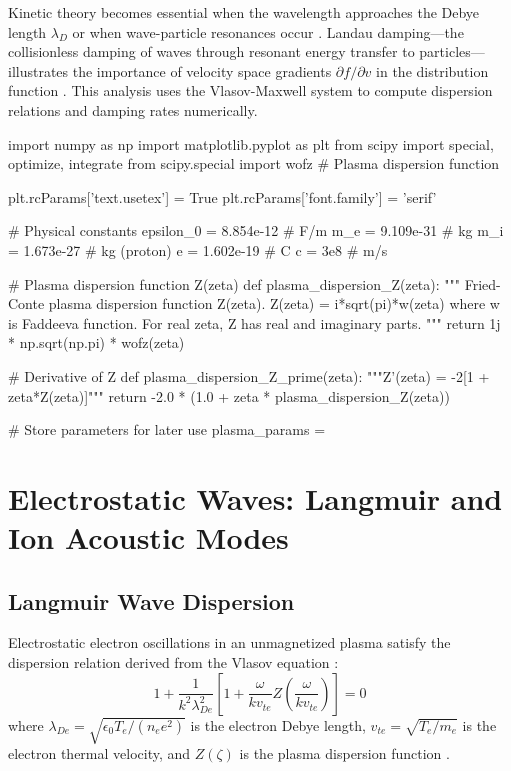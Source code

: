 \documentclass[11pt,a4paper]{article}
\begin{document}
Kinetic theory becomes essential when the wavelength approaches the Debye length $\lambda_D$ or when wave-particle resonances occur \cite{Krall1973}. Landau damping—the collisionless damping of waves through resonant energy transfer to particles—illustrates the importance of velocity space gradients $\partial f/\partial v$ in the distribution function \cite{Landau1946}. This analysis uses the Vlasov-Maxwell system to compute dispersion relations and damping rates numerically.

\begin{pycode}
import numpy as np
import matplotlib.pyplot as plt
from scipy import special, optimize, integrate
from scipy.special import wofz  # Plasma dispersion function

plt.rcParams['text.usetex'] = True
plt.rcParams['font.family'] = 'serif'

# Physical constants
epsilon_0 = 8.854e-12  # F/m
m_e = 9.109e-31  # kg
m_i = 1.673e-27  # kg (proton)
e = 1.602e-19  # C
c = 3e8  # m/s

# Plasma dispersion function Z(zeta)
def plasma_dispersion_Z(zeta):
    """
    Fried-Conte plasma dispersion function Z(zeta).
    Z(zeta) = i*sqrt(pi)*w(zeta) where w is Faddeeva function.
    For real zeta, Z has real and imaginary parts.
    """
    return 1j * np.sqrt(np.pi) * wofz(zeta)

# Derivative of Z
def plasma_dispersion_Z_prime(zeta):
    """Z'(zeta) = -2[1 + zeta*Z(zeta)]"""
    return -2.0 * (1.0 + zeta * plasma_dispersion_Z(zeta))

# Store parameters for later use
plasma_params = {}
\end{pycode}

\section{Electrostatic Waves: Langmuir and Ion Acoustic Modes}

\subsection{Langmuir Wave Dispersion}

Electrostatic electron oscillations in an unmagnetized plasma satisfy the dispersion relation derived from the Vlasov equation \cite{Krall1973}:
\begin{equation}
1 + \frac{1}{k^2 \lambda_{De}^2} \left[ 1 + \frac{\omega}{k v_{te}} Z\left(\frac{\omega}{k v_{te}}\right) \right] = 0
\end{equation}
where $\lambda_{De} = \sqrt{\epsilon_0 T_e/(n_e e^2)}$ is the electron Debye length, $v_{te} = \sqrt{T_e/m_e}$ is the electron thermal velocity, and $Z(\zeta)$ is the plasma dispersion function \cite{Fried1961}.
\end{document}
